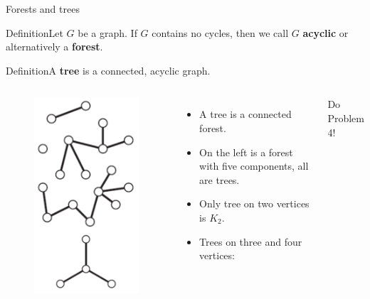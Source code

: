 \documentclass{beamer}
\def\bl[#1]#2{\begin{block}{#1}#2\end{block}}
\def\itemb{\begin{itemize}}
\def\iteme{\end{itemize}}
\begin{document}
\begin{frame}{Forests and trees}
\bl[Definition]{Let $G$ be a graph. If $G$ contains no cycles, then we call $G$ \textbf{acyclic} or alternatively a \textbf{forest}.}
\bl[Definition]{A \textbf{tree} is a connected, acyclic graph.}
\begin{columns}
\vspace{-0.4cm}
\begin{figure}
\centering
\includegraphics[scale=0.42]{Forest.pdf}
\end{figure}
\itemb
\item A tree is a connected forest.
\item On the left is a forest with five components, all are trees.
\item Only tree on two vertices is $K_2$.
\item Trees on three and four vertices:
\iteme
\begin{center}
Do Problem 4!
\end{center}
\end{columns}

\end{frame}
\end{document}
